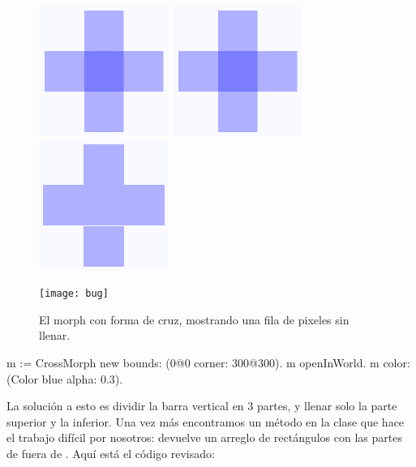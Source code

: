\documentclass[a4paper,10pt,twoside]{book}
\begin{document}
\begin{figure}[t]
\begin{minipage}{0.48\textwidth}
	\ifluluelse
		{\centerline{\includegraphics[scale=0.6]{overdrawBug}}}
		{\centerline{\includegraphics{overdrawBug}}}
	\caption{El centro de la cruz es llenado dos veces con el color.
		}
\end{minipage}
\hfill
\begin{minipage}{0.48\textwidth}
	\ifluluelse
		{\centerline{\includegraphics[scale=0.6]{hairlineBug}}}
		{\centerline{\texttt{[image: bug]}}}
	\caption{El morph con forma de cruz, mostrando una fila de pixeles sin llenar.
		}
\end{minipage}
\end{figure}


\begin{code}{}
m := CrossMorph new bounds: (0@0 corner: 300@300).
m openInWorld.
m color: (Color blue alpha: 0.3).
\end{code}

\noindent
La soluci\'on a esto es dividir la barra vertical en 3 partes, y llenar solo la parte superior y la inferior.
Una vez m\'as encontramos un m\'etodo en la clase  que hace el trabajo dif\'icil por nosotros:  devuelve un arreglo de rect\'angulos con las partes de  fuera de . 
Aqu\'i est\'a el c\'odigo revisado:
\end{document}
